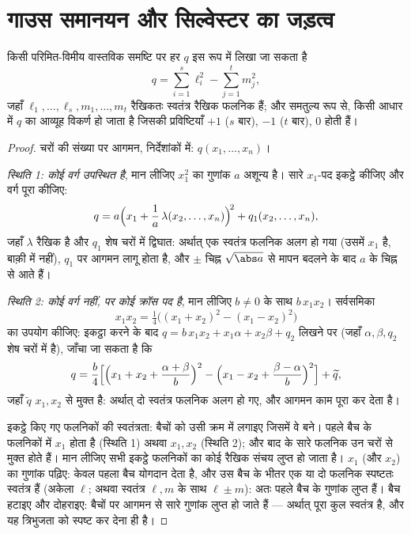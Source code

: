 \section{गाउस समानयन और सिल्वेस्टर का जड़त्व}

\begin{theorem}[गाउस समानयन]\label{thm:b2:quadratic:gauss}
किसी परिमित-विमीय वास्तविक समष्टि पर हर  $q$ इस रूप में लिखा जा
सकता है
\[
q = \sum_{i=1}^{s} \ell_i^2 - \sum_{j=1}^{t} m_j^2 ,
\]
जहाँ $\ell_1, \dots, \ell_s, m_1, \dots, m_t$ रैखिकतः स्वतंत्र रैखिक फलनिक हैं; और समतुल्य रूप से, किसी आधार
में $q$ का आव्यूह विकर्ण हो जाता है जिसकी प्रविष्टियाँ $+1$ ($s$ बार), $-1$
($t$ बार), $0$ होती हैं।
\end{theorem}

\begin{proof}
चरों की संख्या पर आगमन, निर्देशांकों में: $q(x_1,
\dots, x_n)$।

\emph{स्थिति 1: कोई वर्ग उपस्थित है}, मान लीजिए $x_1^2$ का गुणांक $a$ अशून्य
है। सारे $x_1$-पद इकट्ठे कीजिए और वर्ग पूरा कीजिए:
\[
q = a\Bigl(x_1 + \frac{1}{a}\,\lambda(x_2, \dots,
x_n)\Bigr)^{\!2} + q_1(x_2, \dots, x_n),
\]
जहाँ $\lambda$ रैखिक है और $q_1$ शेष चरों में द्विघात: अर्थात् एक स्वतंत्र फलनिक
अलग हो गया (उसमें $x_1$ है, बाक़ी में नहीं), $q_1$ पर आगमन लागू होता है, और
$\pm$ चिह्न $\sqrt{\abs a}$ से मापन बदलने के बाद $a$ के चिह्न से आते हैं।

\emph{स्थिति 2: कोई वर्ग नहीं, पर कोई क्रॉस पद है}, मान लीजिए $b \neq 0$ के साथ
$b\,x_1x_2$। सर्वसमिका
\[
x_1x_2 = \tfrac14\bigl((x_1 + x_2)^2 - (x_1 - x_2)^2\bigr)
\]
का उपयोग कीजिए: इकट्ठा करने के बाद $q = b\,x_1x_2 + x_1\alpha + x_2\beta +
q_2$ लिखने पर (जहाँ $\alpha, \beta, q_2$ शेष चरों में
है), जाँचा जा सकता है कि
\[
q = \frac{b}{4}\Bigl[\Bigl(x_1 + x_2 + \frac{\alpha +
\beta}{b}\Bigr)^{2} - \Bigl(x_1 - x_2 + \frac{\beta -
\alpha}{b}\Bigr)^{2}\Bigr] + \widetilde q ,
\]
जहाँ $\widetilde q$ $x_1, x_2$ से मुक्त है: अर्थात् दो स्वतंत्र फलनिक अलग हो गए, और आगमन
काम पूरा कर देता है।

इकट्ठे किए गए फलनिकों की स्वतंत्रता: बैचों को उसी क्रम में लगाइए जिसमें वे
बने। पहले बैच के फलनिकों में $x_1$ होता है (स्थिति 1) अथवा $x_1, x_2$ (स्थिति 2);
और बाद के सारे फलनिक उन चरों से मुक्त होते हैं। मान लीजिए सभी इकट्ठे
फलनिकों का कोई रैखिक संचय लुप्त हो जाता है। $x_1$ (और $x_2$) का गुणांक
पढ़िए: केवल पहला बैच योगदान देता है, और उस बैच के भीतर एक या दो फलनिक
स्पष्टतः स्वतंत्र हैं (अकेला $\ell$; अथवा स्वतंत्र $\ell, m$ के साथ $\ell \pm
m$): अतः पहले
बैच के गुणांक लुप्त हैं। बैच हटाइए और दोहराइए: बैचों पर आगमन से सारे
गुणांक लुप्त हो जाते हैं --- अर्थात् पूरा कुल स्वतंत्र है, और यह त्रिभुजता
को स्पष्ट कर देना ही है।
\end{proof}

